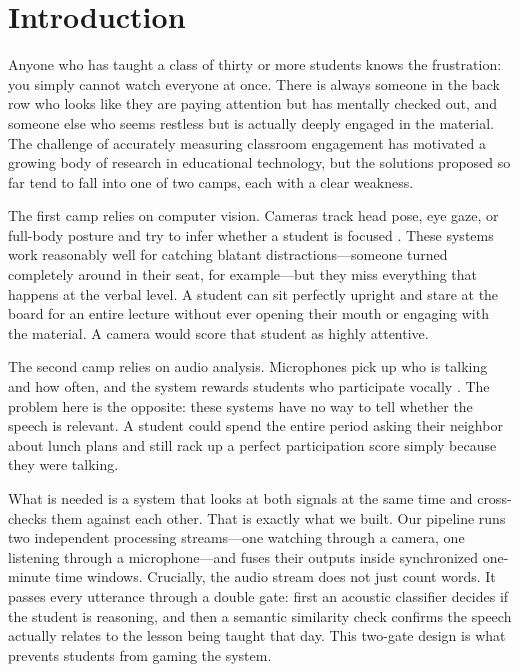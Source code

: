 \documentclass[conference]{IEEEtran}
\begin{document}
\section{Introduction}

Anyone who has taught a class of thirty or more students knows the frustration: you simply cannot watch everyone at once. There is always someone in the back row who looks like they are paying attention but has mentally checked out, and someone else who seems restless but is actually deeply engaged in the material. The challenge of accurately measuring classroom engagement has motivated a growing body of research in educational technology, but the solutions proposed so far tend to fall into one of two camps, each with a clear weakness.

The first camp relies on computer vision. Cameras track head pose, eye gaze, or full-body posture and try to infer whether a student is focused \cite{b1}. These systems work reasonably well for catching blatant distractions---someone turned completely around in their seat, for example---but they miss everything that happens at the verbal level. A student can sit perfectly upright and stare at the board for an entire lecture without ever opening their mouth or engaging with the material. A camera would score that student as highly attentive.

The second camp relies on audio analysis. Microphones pick up who is talking and how often, and the system rewards students who participate vocally \cite{b5}. The problem here is the opposite: these systems have no way to tell whether the speech is relevant. A student could spend the entire period asking their neighbor about lunch plans and still rack up a perfect participation score simply because they were talking.

What is needed is a system that looks at both signals at the same time and cross-checks them against each other. That is exactly what we built. Our pipeline runs two independent processing streams---one watching through a camera, one listening through a microphone---and fuses their outputs inside synchronized one-minute time windows. Crucially, the audio stream does not just count words. It passes every utterance through a double gate: first an acoustic classifier decides if the student is reasoning, and then a semantic similarity check confirms the speech actually relates to the lesson being taught that day. This two-gate design is what prevents students from gaming the system.
\end{document}
